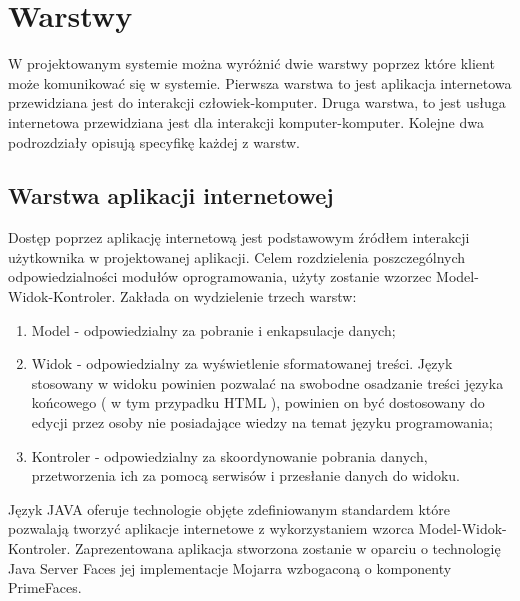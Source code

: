 




\section{Warstwy}
W projektowanym systemie można wyróżnić dwie warstwy poprzez które klient może komunikować się w systemie. Pierwsza warstwa to jest aplikacja internetowa przewidziana jest do interakcji człowiek-komputer. Druga warstwa, to jest usługa internetowa przewidziana jest dla interakcji komputer-komputer. Kolejne dwa podrozdziały opisują specyfikę każdej z warstw.
\subsection{Warstwa aplikacji internetowej}
Dostęp poprzez aplikację internetową jest podstawowym źródłem interakcji użytkownika w projektowanej aplikacji. Celem rozdzielenia poszczególnych odpowiedzialności modułów oprogramowania, użyty zostanie wzorzec Model-Widok-Kontroler. Zakłada on wydzielenie trzech warstw:
\begin{enumerate}
  \item Model - odpowiedzialny za pobranie i enkapsulacje danych;
  \item Widok - odpowiedzialny za wyświetlenie sformatowanej treści. Język stosowany w widoku powinien pozwalać na swobodne osadzanie treści języka końcowego ( w tym przypadku HTML ), powinien on być dostosowany do edycji przez osoby nie posiadające wiedzy na temat języku programowania;
  \item Kontroler - odpowiedzialny za skoordynowanie pobrania danych, przetworzenia ich za pomocą serwisów i przesłanie danych do widoku.
\end{enumerate}

Język JAVA oferuje technologie objęte zdefiniowanym standardem które pozwalają tworzyć aplikacje internetowe z wykorzystaniem wzorca Model-Widok-Kontroler. Zaprezentowana aplikacja stworzona zostanie w oparciu o technologię Java Server Faces jej implementacje Mojarra wzbogaconą o komponenty PrimeFaces.

